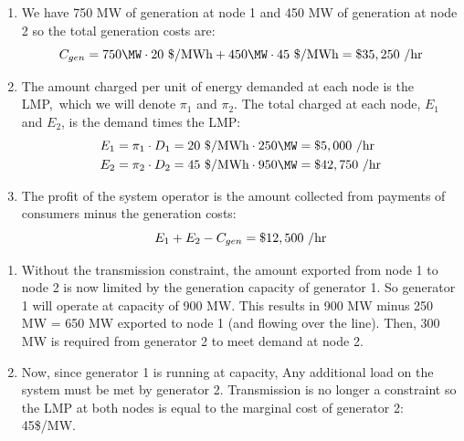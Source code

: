 \documentclass{homework}
\begin{document}
\begin{letterenum}
\begin{enumerate}
    \item We have 750 MW of generation at node 1 and 450 MW of generation at node 2
        so the total generation costs are:
        \begin{equation*}
            C_{gen} = 750 \MW \cdot 20\dolperMWh + 450 \MW \cdot 45\dolperMWh = \$35,250 \perh
        \end{equation*}

    \item The amount charged per unit of energy demanded at each node is the LMP,\
        which we will denote $\pi_1$ and $\pi_2$. The total charged at each node, $E_1$
        and $E_2$, is the demand times the LMP:
        \begin{align*}
            E_1 &= \pi_1 \cdot D_1 = 20\dolperMWh \cdot 250\MW = \$5,000 \perh \\
            E_2 &= \pi_2 \cdot D_2 = 45\dolperMWh \cdot 950\MW = \$42,750 \perh \\
        \end{align*}

    \item The profit of the system operator is the amount collected from payments
        of consumers minus the generation costs:
        \begin{equation*}
            E_1 + E_2 - C_{gen} = \$12,500  \text{ /hr}
        \end{equation*}
    \end{enumerate}
\item 
    \begin{enumerate}
        \item Without the transmission constraint, the amount exported from node
            1 to node 2 is now limited by the generation capacity of generator 1.
            So generator 1 will operate at capacity of 900 MW. This results
            in 900 MW minus 250 MW = 650 MW exported to node 1 (and flowing over
            the line). Then, 300 MW
            is required from generator 2 to meet demand at node 2.

        \item Now, since generator 1 is running at capacity, Any additional
            load on the system must be met by generator 2. Transmission is no
            longer a constraint so the LMP at both nodes is equal to the
            marginal cost of generator 2: 45\$/MW.
    \end{enumerate}
\end{letterenum}
\end{document}
